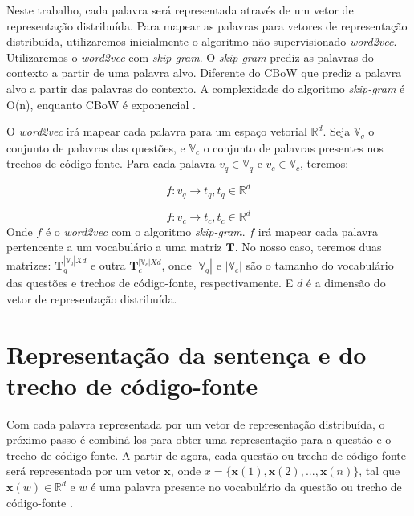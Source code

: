 Neste trabalho, cada palavra será representada através de um vetor de representação distribuída. Para mapear as palavras para vetores de representação distribuída, utilizaremos inicialmente o algoritmo não-supervisionado \textit{word2vec}. Utilizaremos o \textit{word2vec} com \textit{skip-gram}. O \textit{skip-gram} prediz as palavras do contexto a partir de uma palavra alvo. Diferente do CBoW que prediz a palavra alvo a partir das palavras do contexto. A complexidade do algoritmo \textit{skip-gram} é O(n), enquanto CBoW é exponencial . 

O \textit{word2vec} irá mapear cada palavra para um espaço vetorial $\mathbb{R}^{d}$. Seja $\mathbb{V}_{q}$ o conjunto de palavras das questões, e $\mathbb{V}_{c}$ o conjunto de palavras presentes nos trechos de código-fonte. Para cada palavra $v_{q} \in \mathbb{V}_{q}$ e $v_{c} \in \mathbb{V}_c$, teremos:

\begin{equation}
    f: v_{q} \rightarrow t_{q}, t_{q} \in \mathbb{R}^{d}
\end{equation}

\begin{equation}
    f: v_{c} \rightarrow t_{c}, t_{c} \in \mathbb{R}^{d}
\end{equation}
Onde $f$ é o \textit{word2vec} com o algoritmo \textit{skip-gram}. $f$ irá mapear cada palavra pertencente a um vocabulário a uma matriz $\bm{T}$.
No nosso caso, teremos duas matrizes: $\bm{T}_{q}^{|\mathbb{V}_{q}| X d}$ e outra $\bm{T}_{c}^{|\mathbb{V}_{c}| X d}$, onde $|\mathbb{V}_{q}|$ e $|\mathbb{V}_{c}|$ são o tamanho do vocabulário das questões e trechos de código-fonte, respectivamente. E $d$ é a dimensão do vetor de representação distribuída.

\section{Representação da sentença e do trecho de código-fonte}

Com cada palavra representada por um vetor de representação distribuída, o próximo passo é combiná-los para obter uma representação para a questão e o trecho de código-fonte. A partir de agora, cada questão ou trecho de código-fonte será representada por um vetor $\bm{x}$, onde $x = \{ \bm{x}(1), \bm{x}(2), . . ., \bm{x}(n) \}$, tal que $\bm{x}(w) \in \mathbb{R}^{d}$ e $w$ é uma palavra presente no vocabulário da questão ou trecho de código-fonte \citep{cambronero-deep-learning-code-search:2019}. 

